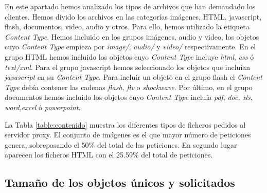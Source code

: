 \documentclass[twocolumn]{Jornadas}
\begin{document}
En este apartado hemos analizado los tipos de archivos que han demandado los clientes. Hemos divido los archivos en las categorías imágenes, HTML, javascript, flash, documentos, video, audio y otros. Para ello, hemos utilizado la etiqueta \emph{Content Type}. Hemos incluido en los grupos imágenes, audio y video, los objetos cuyo \emph{Content Type} empieza por \textit{image/}, \textit{audio/} y \textit{video/} respectivamente. En el grupo HTML hemos incluido los objetos cuyo \emph{Content Type} incluye \textit{html}, \textit{css} ó \textit{text/xml}. Para el grupo javascript hemos seleccionado los objetos que incluían \textit{javascript} en su \emph{Content Type}. Para incluir un objeto en el grupo flash el \emph{Content Type} debía contener las cadenas \textit{flash}, \textit{flv} o \textit{shockwave}. Por último, en el grupo documentos hemos incluido los objetos cuyo \emph{Content Type} incluía \textit{pdf}, \textit{doc}, \textit{xls}, \textit{word},\textit{excel} ó \textit{powerpoint}.

La Tabla \ref{table:contenido} muestra los diferentes tipos de ficheros pedidos al servidor proxy. El conjunto de imágenes es el que mayor número de peticiones genera, sobrepasando el 50\% del total de las peticiones. En segundo lugar aparecen los ficheros HTML con el 25.59\% del total de peticiones. 

\subsection{Tamaño de los objetos únicos y solicitados}
\label{unicos_solicitados}
\end{document}
